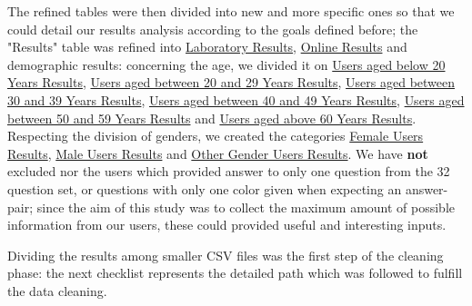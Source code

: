%
The refined tables were then divided into new and more specific ones so that we could detail our results analysis according to the goals defined before;
the "Results" table was refined into \ul{Laboratory Results}, \ul{Online Results} and demographic results: concerning the age, we divided it
on \ul{Users aged below 20 Years Results}, \ul{Users aged between 20 and 29 Years Results}, \ul{Users aged between 30 and 39 Years Results},
\ul{Users aged between 40 and 49 Years Results}, \ul{Users aged between 50 and 59 Years Results} and \ul{Users aged above 60 Years Results}.
Respecting the division of genders, we created the categories \ul{Female Users Results}, \ul{Male Users Results} and \ul{Other Gender Users Results}. We
have \textbf{not} excluded nor the users which provided answer to only one question from the 32 question set, or questions with only one color given when
expecting an answer-pair; since the aim of this study was to collect the maximum amount of possible information from our users, these could provided
useful and interesting inputs. \par
%
Dividing the results among smaller \gls{CSV} files was the first step of the cleaning phase: the next checklist represents the detailed path which
was followed to fulfill the data cleaning.
%
